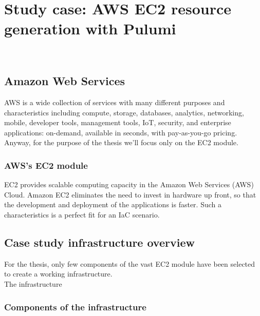 
\chapter{Study case: AWS EC2 resource generation with Pulumi}
\label{cap:case-study}

\\

\section{Amazon Web Services}
AWS is a wide collection of services with many different purposes and characteristics including compute, storage, databases, analytics, networking, mobile, developer tools, management tools, IoT, security, and enterprise applications: on-demand, available in seconds, with pay-as-you-go pricing.
Anyway, for the purpose of the thesis we'll focus only on the EC2 module.

\subsection{AWS's EC2 module}
EC2 provides scalable computing capacity in the Amazon Web Services (AWS) Cloud.
Amazon EC2 eliminates the need to invest in hardware up front, so that the development and deployment of the applications is faster.
Such a characteristics is a perfect fit for an IaC scenario.

\section{Case study infrastructure overview}
For the thesis, only few components of the vast EC2 module have been selected to create a working infrastructure.\\
The infrastructure

\subsection{Components of the infrastructure}

